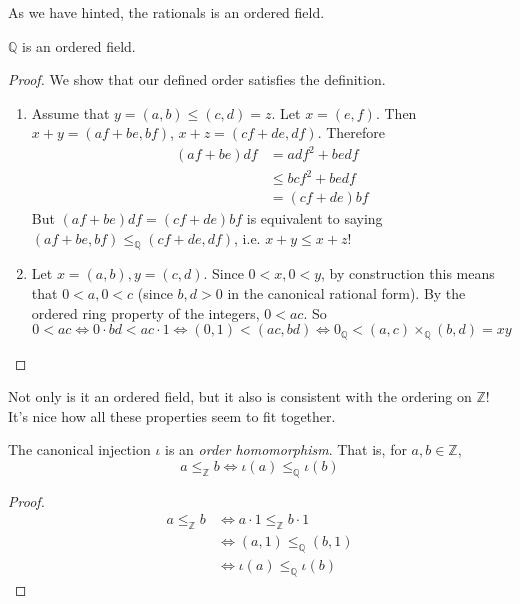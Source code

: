     As we have hinted, the rationals is an ordered field. 

    \begin{theorem}
      $\mathbb{Q}$ is an ordered field. 
    \end{theorem} 
    \begin{proof}
      We show that our defined order satisfies the definition. 
      \begin{enumerate}
        \item Assume that $y = (a, b) \leq (c, d) = z$. Let $x = (e, f)$. Then $x + y = (af + be, bf)$, $x + z = (cf + de, df)$. Therefore 
        \begin{align}
          (af + be) df & = adf^2 + bedf \\ 
                       & \leq bcf^2 + bedf \\
                       & = (cf + de) bf
        \end{align} 
        But $(af + be) df = (cf + de) bf$ is equivalent to saying $(af + be, bf) \leq_{\mathbb{Q}} (cf + de, df)$, i.e. $x + y \leq x + z$!  

        \item Let $x = (a, b), y = (c, d)$. Since $0 < x, 0 < y$, by construction this means that $0 < a, 0 < c$ (since $b, d > 0$ in the canonical rational form). By the ordered ring property of the integers, $0 < ac$. So 
        \begin{equation}
          0 < ac \iff 0 \cdot bd < ac \cdot 1 \iff (0, 1) < (ac, bd)  \iff 0_{\mathbb{Q}} < (a, c) \times_{\mathbb{Q}} (b, d) = x y
        \end{equation}
      \end{enumerate}
    \end{proof} 

    Not only is it an ordered field, but it also is consistent with the ordering on $\mathbb{Z}$! It's nice how all these properties seem to fit together. 

    \begin{theorem}
      The canonical injection $\iota$ is an \textit{order homomorphism}. That is, for $a, b \in \mathbb{Z}$, 
      \begin{equation}
        a \leq_{\mathbb{Z}} b \iff \iota(a) \leq_{\mathbb{Q}} \iota(b)
      \end{equation}
    \end{theorem}
    \begin{proof} 
      \begin{align}
        a \leq_{\mathbb{Z}} b & \iff a \cdot 1 \leq_{\mathbb{Z}} b \cdot 1 \\
                              & \iff (a, 1) \leq_{\mathbb{Q}} (b, 1) \\
                              & \iff \iota(a) \leq_{\mathbb{Q}} \iota(b)
      \end{align}
    \end{proof}

